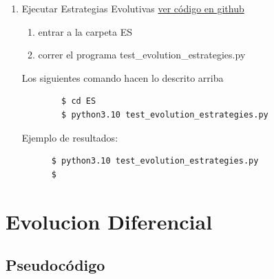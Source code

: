 \documentclass{article}
\begin{document}
\begin{enumerate} 
\item Ejecutar Estrategias Evolutivas
  \href{https://github.com/luisballado/InteligenciaComputacional/tree/master/code/tarea1/ES}{ver código en github}\\
  \begin{enumerate}
  \item entrar a la carpeta ES \\
  \item correr el programa test\_evolution\_estrategies.py\\
  \end{enumerate} 
  
  Los siguientes comando hacen lo descrito arriba

  \begin{commandline}
     \begin{verbatim}
        $ cd ES
        $ python3.10 test_evolution_estrategies.py
     \end{verbatim}
  \end{commandline}

  Ejemplo de resultados:
  \begin{commandline}
	\begin{verbatim}
	  $ python3.10 test_evolution_estrategies.py
	  $ 
	\end{verbatim}
  \end{commandline}
\end{enumerate}


\newpage
\section{Evolucion Diferencial}
\subsection{Pseudocódigo}
\end{document}
